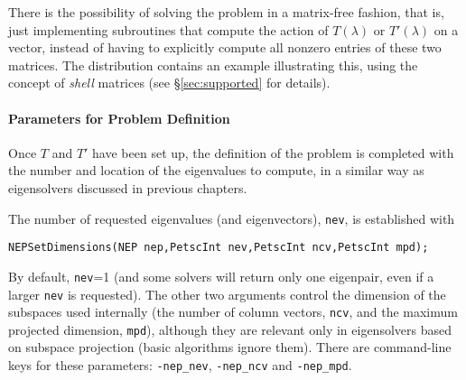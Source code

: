 There is the possibility of solving the problem in a matrix-free fashion, that is, just implementing subroutines that compute the action of $T(\lambda)$ or $T'(\lambda)$ on a vector, instead of having to explicitly compute all nonzero entries of these two matrices. The \slepc distribution contains an example illustrating this, using the concept of \emph{shell} matrices (see \S\ref{sec:supported} for details).

\paragraph{Parameters for Problem Definition}

Once $T$ and $T'$ have been set up, the definition of the problem is completed with the number and location of the eigenvalues to compute, in a similar way as eigensolvers discussed in previous chapters.

	The number of requested eigenvalues (and eigenvectors), \texttt{nev}, is established with
	\begin{Verbatim}[fontsize=\small]
	NEPSetDimensions(NEP nep,PetscInt nev,PetscInt ncv,PetscInt mpd);
	\end{Verbatim}
By default, \texttt{nev}=1 (and some solvers will return only one eigenpair, even if a larger \texttt{nev} is requested). The other two arguments control the dimension of the subspaces used internally (the number of column vectors, \texttt{ncv}, and the maximum projected dimension, \texttt{mpd}), although they are relevant only in eigensolvers based on subspace projection (basic algorithms ignore them). There are command-line keys for these parameters: \Verb!-nep_nev!, \Verb!-nep_ncv! and \Verb!-nep_mpd!.

